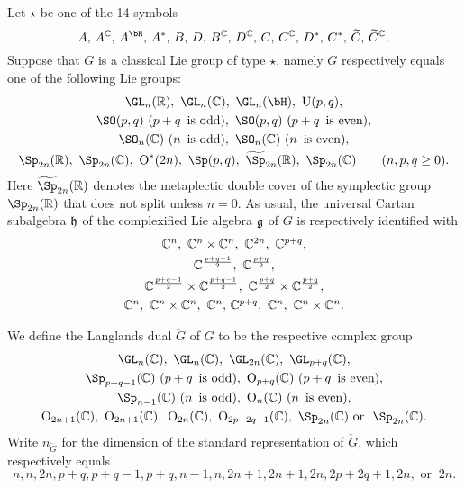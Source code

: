 \documentclass[counting_main.tex]{subfiles}
\begin{document}
Let $\star$ be one of the  14 symbols
\[
\textrm{ $A$, $A^\C$, $A^\bH$, $A^*$, $B$, $D$,   $B^\C$, $D^\C$, $C$, $C^\C$, $D^*$, $C^*$, $\widetilde C$, $\widetilde C^\C$. }
\]
Suppose that $G$ is a classical Lie group of type $\star$, namely $G$ respectively equals
one of the following Lie groups:
\[
\begin{array}{c}
   \GL_n(\R), \ \GL_n(\C), \  \GL_n(\bH),\  \oU(p,q),\smallskip\\
    \SO(p,q)\ (p+q\, \textrm{ is odd}),  \  \SO(p,q)\  (p+q\, \textrm{ is even}),\smallskip\\
     \SO_n(\C) \ (n\, \textrm{ is odd}),  \
     \SO_n(\C) \ (n\, \textrm{ is even}),\smallskip \\
     \Sp_{2n}(\R), \ \Sp_{2n}(\C), \  \oO^*(2n), \  \Sp(p,q),\   \widetilde \Sp_{2n}(\R), \ \Sp_{2n}(\C) \qquad (n, p, q\geq 0).
     \end{array}
\]
Here $\widetilde \Sp_{2n}(\R)$ denotes the metaplectic double cover of the symplectic group $\Sp_{2n}(\R)$ that does not split unless $n=0$.
As usual, the universal Cartan subalgebra $\mathfrak h$ of
 the complexified Lie algebra $\mathfrak g$ of $G$ is respectively identified with
\[
\begin{array}{c}
  \C^n, \ \C^n\times \C^n, \ \C^{2n},  \ \C^{p+q},\smallskip \\
\C^{\frac{p+q-1}{2}},\ \C^{\frac{p+q}{2}}, \smallskip \\
\C^{\frac{p+q-1}{2}}\times \C^{\frac{p+q-1}{2}},\  \C^{\frac{p+q}{2}}\times \C^{\frac{p+q}{2}}, \smallskip \\
\C^n,\ \C^n\times \C^n, \ \C^n, \, \C^{p+q},   \ \C^n,\ \C^n\times \C^n.
     \end{array}
\]


We define the Langlands dual $\check G$ of $G$ to be the respective complex group
\[
 \begin{array}{c}
   \GL_n(\C), \ \GL_n(\C), \  \GL_{2n}(\C),\  \GL_{p+q}(\C),\smallskip\\
    \Sp_{p+q-1}(\C)\ (p+q\, \textrm{ is odd}),  \  \oO_{p+q}(\C)\  (p+q\, \textrm{ is even}),\smallskip\\
     \Sp_{n-1}(\C) \ (n\, \textrm{ is odd}),  \
     \oO_n(\C) \ (n\, \textrm{ is even}),\smallskip \\
     \oO_{2n+1}(\C), \ \oO_{2n+1}(\C), \  \oO_{2n}(\C), \  \oO_{2p+2q+1}(\C),\    \Sp_{2n}(\C) \  \textrm{or } \  \Sp_{2n}(\C).
     \end{array}
\]
Write $n_{\check G}$ for the dimension of the standard representation of $\check G$, which respectively equals
\[
 n, n, 2n, p+q, p+q-1, p+q, n-1, n, 2n+1, 2n+1, 2n, 2p+2q+1, 2n, \textrm{ or }\ 2n.
\]
\end{document}
